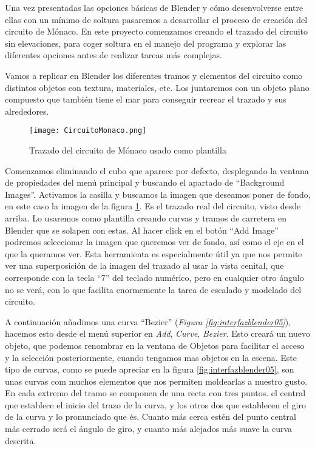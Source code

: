 Una vez presentadas las opciones básicas de Blender y cómo desenvolverse entre ellas con un mínimo de soltura pasaremos a desarrollar el proceso de creación del circuito de Mónaco. En este proyecto comenzamos creando el trazado del circuito  sin elevaciones, para coger soltura en el manejo del programa y explorar las diferentes opciones antes de realizar tareas más complejas. 

Vamos a replicar en Blender los diferentes tramos y elementos del circuito como distintos objetos con textura, materiales, etc. Los juntaremos con un objeto plano compuesto que también tiene el mar para conseguir recrear el trazado y sus alrededores.

\begin{figure}[ht]
	\centering
	\texttt{[image: CircuitoMonaco.png]}
	\caption{Trazado del circuito de Mónaco usado como plantilla} \label{fig:circuitomonaco}
\end{figure}

Comenzamos eliminando el cubo que aparece por defecto, desplegando la ventana de propiedades del menú principal y buscando el apartado de “Background Images”. Activamos la casilla y buscamos la imagen que deseamos poner de fondo, en este caso la imagen de la figura  \ref{fig:circuitomonaco}. Es el trazado real del circuito, visto desde arriba. Lo usaremos como plantilla creando curvas y tramos de carretera en Blender que se solapen con estas. Al hacer click en el botón “Add Image” podremos seleccionar la imagen que queremos ver de fondo, así como el eje en el que la queramos ver. Esta herramienta es especialmente útil ya que  nos permite ver una superposición de la imagen del trazado al usar la vista cenital, que corresponde con la tecla “7” del teclado numérico, pero en cualquier otro ángulo no se verá, con lo que facilita enormemente la tarea de escalado y modelado del circuito.

A continuación añadimos una curva “Bezier” (\textit{Figura \ref{fig:interfazblender05}}), hacemos esto desde el menú superior en \textit{Add}, \textit{Curve}, \textit{Bezier}. Esto creará un nuevo objeto, que podemos renombrar en la ventana de Objetos para facilitar el acceso y la selección posteriormente, cuando tengamos mas objetos en la escena. Este tipo de curvas, como se puede apreciar en la figura \ref{fig:interfazblender05}, son unas curvas com muchos elementos que nos permiten moldearlas a nuestro gusto. En cada extremo del tramo se componen de una recta con tres puntos. el central que establece el inicio del trazo de la curva, y los otros dos que establecen el giro de la curva y lo pronunciado que és. Cuanto más cerca estén del punto central más cerrado será el ángulo de giro, y cuanto más alejados más suave la curva descrita.

